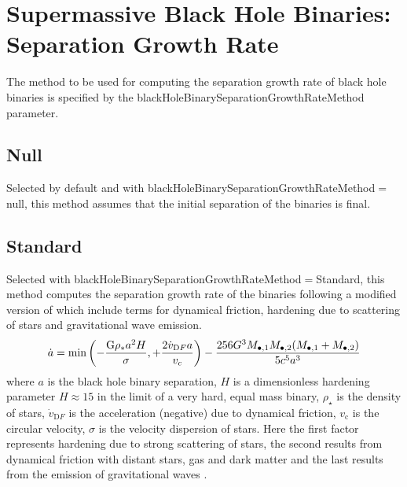 \section{Supermassive Black Hole Binaries: Separation Growth Rate}

The method to be used for computing the separation growth rate of black hole binaries is specified by the {\normalfont \ttfamily blackHoleBinarySeparationGrowthRateMethod} parameter.

\subsection{Null}

Selected by default and with {\normalfont \ttfamily blackHoleBinarySeparationGrowthRateMethod}$=${\normalfont \ttfamily null}, this method assumes that the initial separation of the binaries is final.

\subsection{Standard}

Selected with {\normalfont \ttfamily blackHoleBinarySeparationGrowthRateMethod}$=${\normalfont \ttfamily Standard}, this method computes the separation growth rate of the binaries following a modified version of \cite {volonteri_assembly_2003} which include terms for dynamical friction, hardening due to scattering of stars and gravitational wave emission.
\begin{equation}
\dot{a} = \hbox{min} \left( - \frac{{\mathrm G}\rho _{*}a^2 H}{\sigma}, +\frac{2 \dot{v}_{\mathrm DF} a}{v_c} \right) - \frac{256 G^3 M_{\bullet, 1} M_{\bullet, 2} (M_{\bullet, 1} +M_{\bullet, 2})}{5 c^5 a^3}
\end{equation}
where $a$ is the black hole binary
separation, $H$ is a dimensionless hardening parameter $H\approx 15$ in the limit of 
a very hard, equal mass binary, $\rho _\star$ is the density of stars,
$\dot{v}_{\mathrm DF}$ is the acceleration (negative) due to dynamical friction,
$v_{\mathrm c}$ is the circular velocity, $\sigma$ is the velocity dispersion of stars. Here the first factor represents hardening due to strong scattering of stars, the second results from dynamical friction with distant stars, gas and dark matter and the last results from the emission of gravitational waves \cite{peters_gravitational_1964}.

